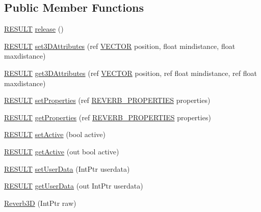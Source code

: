 \subsection*{Public Member Functions}
\begin{DoxyCompactItemize}
\item 
\hyperlink{namespace_f_m_o_d_a305d1176ef3f8c8815861a60407ac33d}{R\+E\+S\+U\+LT} \hyperlink{class_f_m_o_d_1_1_reverb3_d_a7f8fc7adb28c09c2d36cfc725c9f3110}{release} ()
\item 
\hyperlink{namespace_f_m_o_d_a305d1176ef3f8c8815861a60407ac33d}{R\+E\+S\+U\+LT} \hyperlink{class_f_m_o_d_1_1_reverb3_d_adaf18959a4a422eaa5fb73bd9b0a895e}{set3\+D\+Attributes} (ref \hyperlink{struct_f_m_o_d_1_1_v_e_c_t_o_r}{V\+E\+C\+T\+OR} position, float mindistance, float maxdistance)
\item 
\hyperlink{namespace_f_m_o_d_a305d1176ef3f8c8815861a60407ac33d}{R\+E\+S\+U\+LT} \hyperlink{class_f_m_o_d_1_1_reverb3_d_a6d8250616062ae21af248c92eece725b}{get3\+D\+Attributes} (ref \hyperlink{struct_f_m_o_d_1_1_v_e_c_t_o_r}{V\+E\+C\+T\+OR} position, ref float mindistance, ref float maxdistance)
\item 
\hyperlink{namespace_f_m_o_d_a305d1176ef3f8c8815861a60407ac33d}{R\+E\+S\+U\+LT} \hyperlink{class_f_m_o_d_1_1_reverb3_d_af16e44ba6013b50085dcf63a6a879d60}{set\+Properties} (ref \hyperlink{struct_f_m_o_d_1_1_r_e_v_e_r_b___p_r_o_p_e_r_t_i_e_s}{R\+E\+V\+E\+R\+B\+\_\+\+P\+R\+O\+P\+E\+R\+T\+I\+ES} properties)
\item 
\hyperlink{namespace_f_m_o_d_a305d1176ef3f8c8815861a60407ac33d}{R\+E\+S\+U\+LT} \hyperlink{class_f_m_o_d_1_1_reverb3_d_a9ed77465cb5c92a1f06ad874eccf85db}{get\+Properties} (ref \hyperlink{struct_f_m_o_d_1_1_r_e_v_e_r_b___p_r_o_p_e_r_t_i_e_s}{R\+E\+V\+E\+R\+B\+\_\+\+P\+R\+O\+P\+E\+R\+T\+I\+ES} properties)
\item 
\hyperlink{namespace_f_m_o_d_a305d1176ef3f8c8815861a60407ac33d}{R\+E\+S\+U\+LT} \hyperlink{class_f_m_o_d_1_1_reverb3_d_a4d528c30020c3426e65dac1f5427e878}{set\+Active} (bool active)
\item 
\hyperlink{namespace_f_m_o_d_a305d1176ef3f8c8815861a60407ac33d}{R\+E\+S\+U\+LT} \hyperlink{class_f_m_o_d_1_1_reverb3_d_a3a0591025bc4ba9c5be4eee2e1cdbd62}{get\+Active} (out bool active)
\item 
\hyperlink{namespace_f_m_o_d_a305d1176ef3f8c8815861a60407ac33d}{R\+E\+S\+U\+LT} \hyperlink{class_f_m_o_d_1_1_reverb3_d_a3300368e83bffa3e4b753f520e335952}{set\+User\+Data} (Int\+Ptr userdata)
\item 
\hyperlink{namespace_f_m_o_d_a305d1176ef3f8c8815861a60407ac33d}{R\+E\+S\+U\+LT} \hyperlink{class_f_m_o_d_1_1_reverb3_d_a0193d3e1ffd3f9a38afaf122a7b7b095}{get\+User\+Data} (out Int\+Ptr userdata)
\item 
\hyperlink{class_f_m_o_d_1_1_reverb3_d_a3fbd6427e524893190c9cea3c5cddcaf}{Reverb3D} (Int\+Ptr raw)
\end{DoxyCompactItemize}
